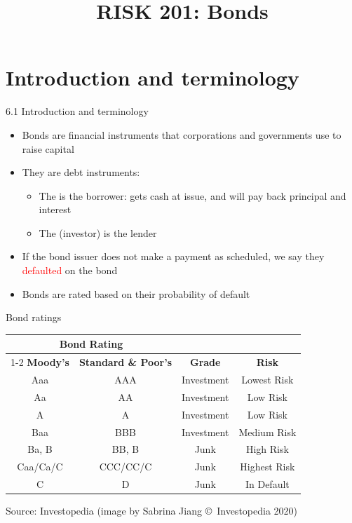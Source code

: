 \documentclass{beamer}
\title{RISK 201: Bonds}
\begin{document}
\maketitle

\section{Introduction and terminology}

\begin{frame}{6.1 Introduction and terminology}

\begin{itemize}
\item Bonds are financial instruments that corporations and governments use to raise capital
\item They are debt instruments:
  \begin{itemize}
  \item The  is the borrower: gets cash at issue, and will pay back principal and interest
  \item The  (investor) is the lender
  \end{itemize}
\item If the bond issuer does not make a payment as scheduled, we say they \textcolor{red}{defaulted} on the bond
\item Bonds are rated based on their probability of default
\end{itemize}

\end{frame}

\begin{frame}{Bond ratings}

\begin{center}
\renewcommand{\arraystretch}{1.2}
\small
\begin{tabular}{cccc}
\toprule
\multicolumn{2}{c}{\textbf{Bond Rating}} & & \\
\cmidrule(r){1-2}
\textbf{Moody's} & \textbf{Standard \& Poor's} & \textbf{Grade} & \textbf{Risk} \\
\midrule
Aaa & AAA & Investment & Lowest Risk \\
Aa & AA & Investment & Low Risk \\
A & A & Investment & Low Risk \\
Baa & BBB & Investment & Medium Risk \\
Ba, B & BB, B & Junk & High Risk \\
Caa/Ca/C & CCC/CC/C & Junk & Highest Risk \\
C & D & Junk & In Default \\
\bottomrule
\end{tabular}

\medskip
{\tiny Source: Investopedia (image by Sabrina Jiang \copyright\ Investopedia 2020)}
\end{center}

\end{frame}
\end{document}
